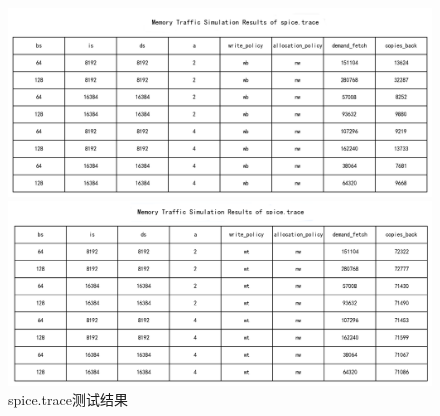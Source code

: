 \documentclass[12pt,hyperref,a4paper,UTF8]{ctexart}
\begin{document}
\begin{figure}[H]
    \centering
    \begin{minipage}[b]{0.45\textwidth}
        \centering
        \includegraphics[width=\textwidth]{./figures/fig/image33.png}
    \end{minipage}
    \hfill
    \begin{minipage}[b]{0.45\textwidth}
        \centering
        \includegraphics[width=\textwidth]{./figures/fig/image34.png}
    \end{minipage}
    \caption{spice.trace测试结果}
\end{figure}
\end{document}
